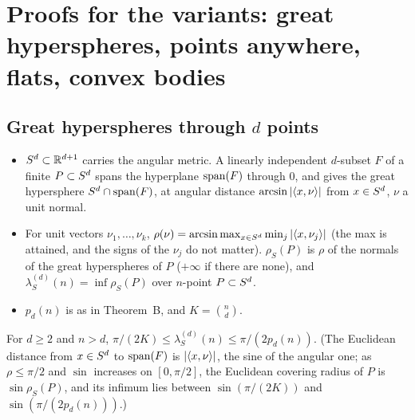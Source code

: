 \section{Proofs for the variants: great hyperspheres, points anywhere, flats, convex bodies}
\label{app:D}

\subsection{Great hyperspheres through \texorpdfstring{$d$}{d} points}
\label{sec:D-spheres}

\begin{definition}\leavevmode
\begin{itemize}
  \item $S^d\subset\mathbb{R}^{d+1}$ carries the angular metric. A linearly independent $d$-subset $F$ of a
    finite $P\subset S^d$ spans the hyperplane $\operatorname{span}(F)$ through $0$, and gives the great hypersphere
    $S^d\cap\operatorname{span}(F)$, at angular distance $\arcsin\left|\langle x,\nu\rangle\right|$ from $x\in S^d$, $\nu$ a unit normal.
  \item For unit vectors $\nu_1,\dots,\nu_k$, $\rho(\nu)=\arcsin\max_{x\in S^d}\min_j\left|\langle x,\nu_j\rangle\right|$ (the max is
    attained, and the signs of the $\nu_j$ do not matter). $\rho_S(P)$ is $\rho$ of the normals of the great
    hyperspheres of $P$ ($+\infty$ if there are none), and $\lambda_S^{(d)}(n)=\inf\rho_S(P)$ over $n$-point
    $P\subset S^d$.
  \item $p_d(n)$ is as in Theorem~B, and $K=\binom nd$.
\end{itemize}
\end{definition}

\begin{proposition}\label{D:spheres}
For $d\ge2$ and $n>d$, $\pi/(2K)\le\lambda_S^{(d)}(n)\le\pi/(2p_d(n))$. (The Euclidean distance from $x\in S^d$ to $\operatorname{span}(F)$ is $\left|\langle x,\nu\rangle\right|$, the sine of the angular one; as
$\rho\le\pi/2$ and $\sin$ increases on $[0,\pi/2]$, the Euclidean covering radius of $P$ is $\sin\rho_S(P)$, and its
infimum lies between $\sin(\pi/(2K))$ and $\sin(\pi/(2p_d(n)))$.)
\end{proposition}

